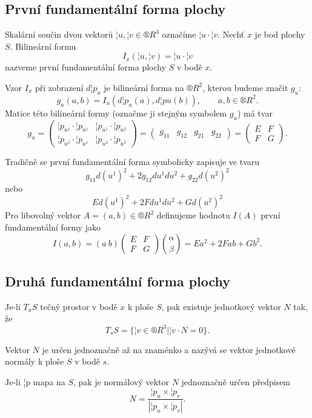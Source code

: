 \documentclass[12pt]{article}                   %
\begin{document}
    \subsection{První fundamentální forma plochy}
        \begin{definice}
            Skalární součin dvou vektorů $¦u, ¦v \in ®R^3$ označíme $¦u·¦v$. Nechť $x$ je bod plochy $S$. Bilineární formu
            $$ I_x(¦u, ¦v) = ¦u·¦v $$
            nazveme první fundamentální forma plochy $S$ v bodě $x$.

            Vzor $I_x$ při zobrazení $d¦p_u$ je bilineární forma na $®R^2$, kterou budeme značit $g_u$:
            $$ g_u(a, b) = I_x(d¦p_u(a), d¦pu(b)), \qquad a, b \in ®R^2. $$
            Matice této bilineární formy (označme ji stejným symbolem $g_u$) má tvar
            $$ g_u = \begin{pmatrix} ¦p_{u^1}·¦p_{u^1} & ¦p_{u^1}·¦p_{u^2} \\ ¦p_{u^2}·¦p_{u^1} & ¦p_{u^2}·¦p_{u^2} \end{pmatrix} = \begin{pmatrix} g_{11} & g_{12} & g_{21} & g_{22} \end{pmatrix} = \begin{pmatrix} E & F \\ F & G \end{pmatrix}. $$

            Tradičně se první fundamentální forma symbolicky zapisuje ve tvaru
            $$ g_{11}d(u^1)^2 + 2g_{12}du^1du^2 + g_{22}d(u^2)^2 $$ 
            nebo
            $$ Ed(u^1)^2 + 2Fdu^1du^2 + Gd(u^2)^2 $$
            Pro libovolný vektor $A = (a, b) \in ®R^2$ definujeme hodnotu $I(A)$ první fundamentální formy jako
            $$ I(a, b) = (a\ b)\begin{pmatrix} E & F \\ F & G \end{pmatrix} \binom{\alpha}{\beta} = Ea^2 + 2Fab + Gb^2. $$ 
        \end{definice}

    \subsection{Druhá fundamentální forma plochy}
        \begin{definice}
            Je-li $T_xS$ tečný prostor v bodě $x$ k ploše $S$, pak existuje jednotkový vektor $N$ tak, že
            $$ T_sS = \{¦v \in ®R^3 | ¦v·N = 0\}. $$

            Vektor $N$ je určen jednoznačně až na znaménko a nazývá se vektor jednotkové normály k ploše $S$ v bodě $s$.

            Je-li ¦p mapa na $S$, pak je normálový vektor $N$ jednoznačně určen předpisem
            $$ N = \frac{¦p_u \times ¦p_v}{|¦p_u \times ¦p_v|}. $$ 
        \end{definice}
\end{document}
